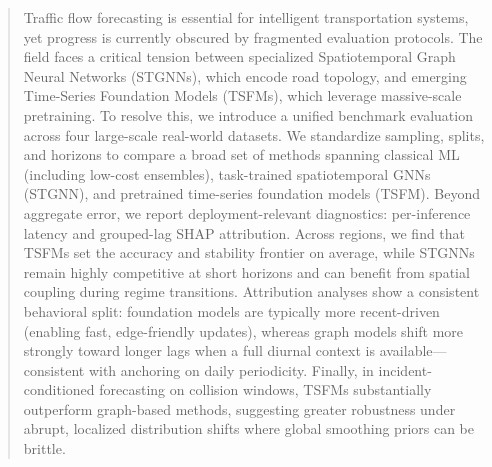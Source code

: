 \documentclass[10pt]{article}
\begin{document}
\begin{abstract}

Traffic flow forecasting is essential for intelligent transportation systems, yet progress is currently obscured by fragmented evaluation protocols. The field faces a critical tension between specialized Spatiotemporal Graph Neural Networks (STGNNs), which encode road topology, and emerging Time-Series Foundation Models (TSFMs), which leverage massive-scale pretraining. To resolve this, we introduce a unified benchmark evaluation across four large-scale real-world datasets. We standardize sampling, splits, and horizons to compare a broad set of methods spanning classical ML (including low-cost ensembles), task-trained spatiotemporal GNNs (STGNN), and pretrained time-series foundation models (TSFM). Beyond aggregate error, we report deployment-relevant diagnostics: per-inference latency and grouped-lag SHAP attribution. Across regions, we find that TSFMs set the accuracy and stability frontier on average, while STGNNs remain highly competitive at short horizons and can benefit from spatial coupling during regime transitions. Attribution analyses show a consistent behavioral split: foundation models are typically more recent-driven (enabling fast, edge-friendly updates), whereas graph models shift more strongly toward longer lags when a full diurnal context is available—consistent with anchoring on daily periodicity. Finally, in incident-conditioned forecasting on collision windows, TSFMs substantially outperform graph-based methods, suggesting greater robustness under abrupt, localized distribution shifts where global smoothing priors can be brittle.

\end{abstract}


\end{document}
